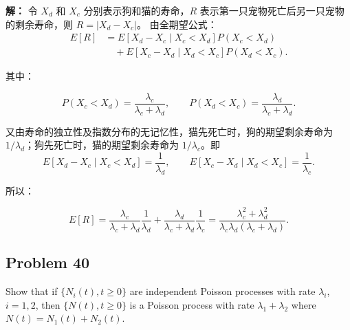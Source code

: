 \documentclass[12pt,a4paper]{article}
\begin{document}
\begin{answerbox}
\textbf{解：}
令 $X_d$ 和 $X_c$ 分别表示狗和猫的寿命，$R$ 表示第一只宠物死亡后另一只宠物的剩余寿命，则 $R=|X_d-X_c|$。
由全期望公式：
$$
\begin{aligned}
E[R]
&=E[X_d-X_c\mid X_c<X_d]P(X_c<X_d)\\
&\quad+E[X_c-X_d\mid X_d<X_c]P(X_d<X_c).
\end{aligned}
$$

其中：

$$
P(X_c<X_d)=\frac{\lambda_c}{\lambda_c+\lambda_d},
\qquad
P(X_d<X_c)=\frac{\lambda_d}{\lambda_c+\lambda_d}.
$$

又由寿命的独立性及指数分布的无记忆性，猫先死亡时，狗的期望剩余寿命为 $1/\lambda_d$；狗先死亡时，猫的期望剩余寿命为 $1/\lambda_c$。即
$$
E[X_d-X_c\mid X_c<X_d]=\frac{1}{\lambda_d},
\qquad
E[X_c-X_d\mid X_d<X_c]=\frac{1}{\lambda_c}.
$$

所以：

$$
E[R]
=\frac{\lambda_c}{\lambda_c+\lambda_d}\frac{1}{\lambda_d}
+\frac{\lambda_d}{\lambda_c+\lambda_d}\frac{1}{\lambda_c}
=\frac{\lambda_c^2+\lambda_d^2}
{\lambda_c\lambda_d(\lambda_c+\lambda_d)}.
$$
\end{answerbox}

\subsection{Problem 40}

Show that if $\{N_i(t), t \ge 0\}$ are independent Poisson processes with rate $\lambda_i$, $i=1,2$, then $\{N(t), t \ge 0\}$ is a Poisson process with rate $\lambda_1+\lambda_2$ where $N(t)=N_1(t)+N_2(t)$.
\end{document}

